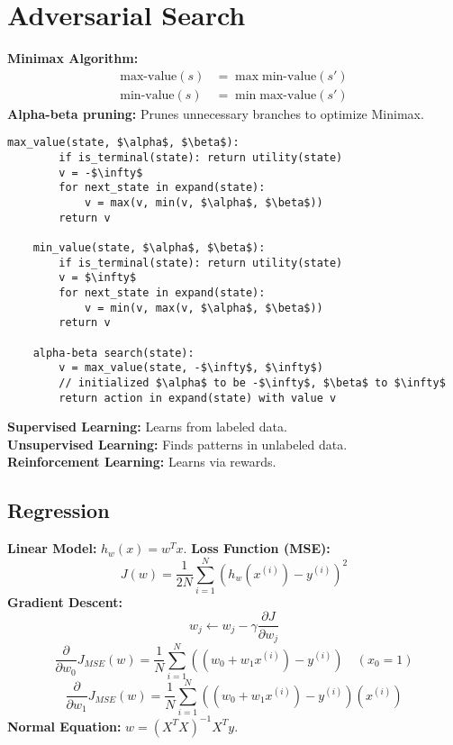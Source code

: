 \documentclass[twocolumn, 10pt]{article}
\begin{document}
\section*{Adversarial Search}
\textbf{Minimax Algorithm:}
\begin{align*}
    \text{max-value}(s) &= \max \text{min-value}(s') \\
    \text{min-value}(s) &= \min \text{max-value}(s')
\end{align*}
\textbf{Alpha-beta pruning:} Prunes unnecessary branches to optimize Minimax.
\begin{lstlisting}[mathescape=true]
    max_value(state, $\alpha$, $\beta$):
        if is_terminal(state): return utility(state)
        v = -$\infty$
        for next_state in expand(state):
            v = max(v, min(v, $\alpha$, $\beta$))
        return v
    
    min_value(state, $\alpha$, $\beta$):
        if is_terminal(state): return utility(state)
        v = $\infty$
        for next_state in expand(state):
            v = min(v, max(v, $\alpha$, $\beta$))
        return v

    alpha-beta search(state): 
        v = max_value(state, -$\infty$, $\infty$) 
        // initialized $\alpha$ to be -$\infty$, $\beta$ to $\infty$
        return action in expand(state) with value v
\end{lstlisting}
\textbf{Supervised Learning:} Learns from labeled data.\\
\textbf{Unsupervised Learning:} Finds patterns in unlabeled data.\\
\textbf{Reinforcement Learning:} Learns via rewards.
\subsection*{Regression}
\textbf{Linear Model:} $h_w(x) = w^T x$.
\textbf{Loss Function (MSE):}
\begin{equation}
    J(w) = \frac{1}{2N} \sum_{i=1}^{N} (h_w(x^{(i)}) - y^{(i)})^2
\end{equation}
\textbf{Gradient Descent:}
\begin{equation}
    w_j \leftarrow w_j - \gamma \frac{\partial J}{\partial w_j}
\end{equation}
    \[\frac{\partial }{\partial w_0} J_{MSE}(w)= \frac{1}{N} \sum_{i=1}^{N}((w_0 + w_1 x^{(i)}) - y^{(i)}) \quad {(x_0 = 1)}\]
    \[\frac{\partial }{\partial w_1} J_{MSE}(w)= \frac{1}{N} \sum_{i=1}^{N}((w_0 + w_1 x^{(i)}) - y^{(i)})(x^{(i)})\]
\textbf{Normal Equation:} $w = (X^TX)^{-1}X^Ty$.
\end{document}
